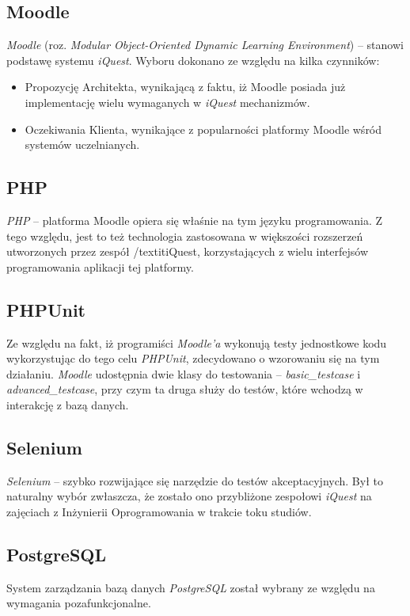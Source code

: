 
\subsection{Moodle}
\emph{Moodle} (roz. \textit{Modular Object-Oriented Dynamic Learning Environment}) -- stanowi podstawę systemu \textit{iQuest}. Wyboru dokonano ze względu na kilka czynników:
\begin{itemize}
\item{Propozycję Architekta, wynikającą z faktu, iż Moodle posiada już implementację wielu wymaganych w \textit{iQuest} mechanizmów.}
\item{Oczekiwania Klienta, wynikające z popularności platformy Moodle wśród systemów uczelnianych.}
\end{itemize}

\subsection{PHP}
\emph{PHP} -- platforma Moodle opiera się właśnie na tym języku programowania. Z tego względu, jest to też technologia zastosowana w większości rozszerzeń utworzonych przez zespół /textit{iQuest}, korzystających z wielu interfejsów programowania aplikacji tej platformy.

\subsection{PHPUnit}
Ze względu na fakt, iż programiści \textit{Moodle'a} wykonują testy jednostkowe kodu wykorzystując do tego celu \emph{PHPUnit}, zdecydowano o wzorowaniu się na tym działaniu. \textit{Moodle} udostępnia dwie klasy do testowania -- \textit{basic\_testcase} i \textit{advanced\_testcase}, przy czym ta druga służy do testów, które wchodzą w interakcję z bazą danych.

\subsection{Selenium}
\emph{Selenium} -- szybko rozwijające się narzędzie do testów akceptacyjnych. Był to naturalny wybór zwłaszcza, że zostało ono przybliżone zespołowi \textit{iQuest} na zajęciach z Inżynierii Oprogramowania w trakcie toku studiów.

\subsection{PostgreSQL}
System zarządzania bazą danych \emph{PostgreSQL} został wybrany ze względu na wymagania pozafunkcjonalne.


